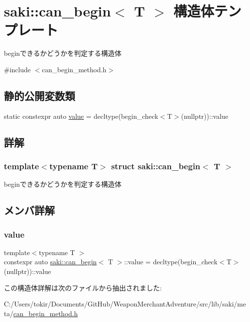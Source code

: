 \hypertarget{structsaki_1_1can__begin}{}\section{saki\+:\+:can\+\_\+begin$<$ T $>$ 構造体テンプレート}
\label{structsaki_1_1can__begin}


beginできるかどうかを判定する構造体  




{\ttfamily \#include $<$can\+\_\+begin\+\_\+method.\+h$>$}

\subsection*{静的公開変数類}
\begin{DoxyCompactItemize}
\item 
static constexpr auto \mbox{\hyperlink{structsaki_1_1can__begin_a6d16b8cbacbf7d9be197d09c517d503d}{value}} = decltype(begin\+\_\+check$<$T$>$(nullptr))\+::value
\end{DoxyCompactItemize}


\subsection{詳解}
\subsubsection*{template$<$typename T$>$\newline
struct saki\+::can\+\_\+begin$<$ T $>$}

beginできるかどうかを判定する構造体 

\subsection{メンバ詳解}
\mbox{\label{structsaki_1_1can__begin_a6d16b8cbacbf7d9be197d09c517d503d}} 
\subsubsection{\texorpdfstring{value}{value}}
{\footnotesize\ttfamily template$<$typename T $>$ \\
constexpr auto \mbox{\hyperlink{structsaki_1_1can__begin}{saki\+::can\+\_\+begin}}$<$ T $>$\+::value = decltype(begin\+\_\+check$<$T$>$(nullptr))\+::value\hspace{0.3cm}{\ttfamily [static]}}



この構造体詳解は次のファイルから抽出されました\+:\begin{DoxyCompactItemize}
\item 
C\+:/\+Users/tokir/\+Documents/\+Git\+Hub/\+Weapon\+Merchant\+Adventure/src/lib/saki/meta/\mbox{\hyperlink{can__begin__method_8h}{can\+\_\+begin\+\_\+method.\+h}}\end{DoxyCompactItemize}
